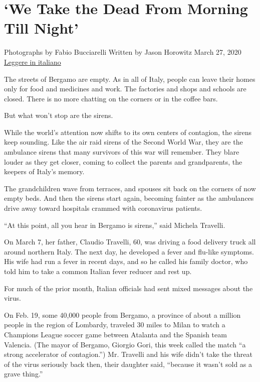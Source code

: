 \hypertarget{we-take-the-dead-from-morning-till-night-1}{%
\section{`We Take the Dead From Morning Till
Night'}\label{we-take-the-dead-from-morning-till-night-1}}

Photographs by Fabio Bucciarelli Written by Jason Horowitz March 27,
2020
\href{https://www.nytimes.com/it/interactive/2020/03/29/world/europe/coronavirus-italy-bergamo.html}{Leggere
in italiano}

The streets of Bergamo are empty. As in all of Italy, people can leave
their homes only for food and medicines and work. The factories and
shops and schools are closed. There is no more chatting on the corners
or in the coffee bars.

But what won't stop are the sirens.

While the world's attention now shifts to its own centers of contagion,
the sirens keep sounding. Like the air raid sirens of the Second World
War, they are the ambulance sirens that many survivors of this war will
remember. They blare louder as they get closer, coming to collect the
parents and grandparents, the keepers of Italy's memory.

The grandchildren wave from terraces, and spouses sit back on the
corners of now empty beds. And then the sirens start again, becoming
fainter as the ambulances drive away toward hospitals crammed with
coronavirus patients.

``At this point, all you hear in Bergamo is sirens,'' said Michela
Travelli.

On March 7, her father, Claudio Travelli, 60, was driving a food
delivery truck all around northern Italy. The next day, he developed a
fever and flu-like symptoms. His wife had run a fever in recent days,
and so he called his family doctor, who told him to take a common
Italian fever reducer and rest up.

For much of the prior month, Italian officials had sent mixed messages
about the virus.

On Feb. 19, some 40,000 people from Bergamo, a province of about a
million people in the region of Lombardy, traveled 30 miles to Milan to
watch a Champions League soccer game between Atalanta and the Spanish
team Valencia. (The mayor of Bergamo, Giorgio Gori, this week called the
match ``a strong accelerator of contagion.'') Mr. Travelli and his wife
didn't take the threat of the virus seriously back then, their daughter
said, ``because it wasn't sold as a grave thing.''

